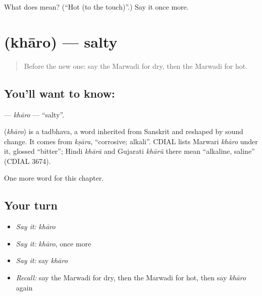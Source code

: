 \begin{tcolorbox}[breakable,colback=teal!4,colframe=teal!35!black,title={Before you move on}]
What does  mean? (\textquotedblleft{}Hot (to the touch)\textquotedblright{}.) Say it once more.
\end{tcolorbox}
\section[\texorpdfstring{\mw{खारो} (khāro)}{खारो (khāro)}]{ (khāro) — salty}

\label{lesson:MW-C143-kharo}



\begin{quote}
Before the new one: say the Marwadi for dry, then the Marwadi for hot.
\end{quote}

\subsection*{You'll want to know: }
\textbf{} — \emph{khāro} — \textquotedblleft{}salty\textquotedblright{}.

\begin{cousinweb}
\textbf{} (\emph{khāro}) is a tadbhava, a word inherited from Sanskrit and reshaped by sound change. It comes from \emph{kṣāra}, \textquotedblleft{}corrosive; alkali\textquotedblright{}. CDIAL lists Marwari \emph{khāro} under it, glossed \textquotedblleft{}bitter\textquotedblright{}; Hindi \emph{khārā} and Gujarati \emph{khārũ} there mean \textquotedblleft{}alkaline, saline\textquotedblright{} (CDIAL 3674).
\end{cousinweb}

\begin{grammarlens}[title={What you've built}]
One more word for this chapter.
\end{grammarlens}

\subsection*{Your turn}
\begin{itemize}
\raggedright
  \item \emph{Say it:} \emph{khāro}
  \item \emph{Say it:} \emph{khāro}, once more
  \item \emph{Say it:} say \emph{khāro}
  \item \emph{Recall:} say the Marwadi for dry, then the Marwadi for hot, then say \emph{khāro} again
\end{itemize}

